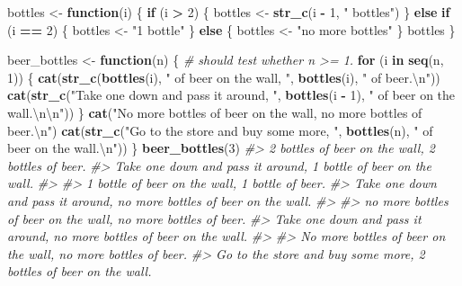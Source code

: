 \documentclass[]{book}
\newenvironment{Shaded}{\begin{snugshade}}{\end{snugshade}}
\newcommand{\CharTok}[1]{\textcolor[rgb]{0.31,0.60,0.02}{#1}}
\newcommand{\CommentTok}[1]{\textcolor[rgb]{0.56,0.35,0.01}{\textit{#1}}}
\newcommand{\ControlFlowTok}[1]{\textcolor[rgb]{0.13,0.29,0.53}{\textbf{#1}}}
\newcommand{\DecValTok}[1]{\textcolor[rgb]{0.00,0.00,0.81}{#1}}
\newcommand{\KeywordTok}[1]{\textcolor[rgb]{0.13,0.29,0.53}{\textbf{#1}}}
\newcommand{\NormalTok}[1]{#1}
\newcommand{\OperatorTok}[1]{\textcolor[rgb]{0.81,0.36,0.00}{\textbf{#1}}}
\newcommand{\StringTok}[1]{\textcolor[rgb]{0.31,0.60,0.02}{#1}}
\theoremstyle{definition}
\theoremstyle{definition}
\theoremstyle{definition}
\theoremstyle{remark}
\begin{document}
\begin{Shaded}
\begin{Highlighting}[]
\NormalTok{bottles <-}\StringTok{ }\ControlFlowTok{function}\NormalTok{(i) \{}
  \ControlFlowTok{if}\NormalTok{ (i }\OperatorTok{>}\StringTok{ }\DecValTok{2}\NormalTok{) \{}
\NormalTok{   bottles <-}\StringTok{ }\KeywordTok{str_c}\NormalTok{(i }\OperatorTok{-}\StringTok{ }\DecValTok{1}\NormalTok{, }\StringTok{" bottles"}\NormalTok{)}
\NormalTok{  \} }\ControlFlowTok{else} \ControlFlowTok{if}\NormalTok{ (i }\OperatorTok{==}\StringTok{ }\DecValTok{2}\NormalTok{) \{}
\NormalTok{   bottles <-}\StringTok{ "1 bottle"}
\NormalTok{  \} }\ControlFlowTok{else}\NormalTok{ \{}
\NormalTok{   bottles <-}\StringTok{ "no more bottles"}
\NormalTok{  \}}
\NormalTok{  bottles}
\NormalTok{\}}

\NormalTok{beer_bottles <-}\StringTok{ }\ControlFlowTok{function}\NormalTok{(n) \{}
  \CommentTok{# should test whether n >= 1.}
  \ControlFlowTok{for}\NormalTok{ (i }\ControlFlowTok{in} \KeywordTok{seq}\NormalTok{(n, }\DecValTok{1}\NormalTok{)) \{}
     \KeywordTok{cat}\NormalTok{(}\KeywordTok{str_c}\NormalTok{(}\KeywordTok{bottles}\NormalTok{(i), }\StringTok{" of beer on the wall, "}\NormalTok{, }\KeywordTok{bottles}\NormalTok{(i), }\StringTok{" of beer.}\CharTok{\textbackslash{}n}\StringTok{"}\NormalTok{))}
     \KeywordTok{cat}\NormalTok{(}\KeywordTok{str_c}\NormalTok{(}\StringTok{"Take one down and pass it around, "}\NormalTok{, }\KeywordTok{bottles}\NormalTok{(i }\OperatorTok{-}\StringTok{ }\DecValTok{1}\NormalTok{),}
                \StringTok{" of beer on the wall.}\CharTok{\textbackslash{}n\textbackslash{}n}\StringTok{"}\NormalTok{))}
\NormalTok{  \}}
  \KeywordTok{cat}\NormalTok{(}\StringTok{"No more bottles of beer on the wall, no more bottles of beer.}\CharTok{\textbackslash{}n}\StringTok{"}\NormalTok{)}
  \KeywordTok{cat}\NormalTok{(}\KeywordTok{str_c}\NormalTok{(}\StringTok{"Go to the store and buy some more, "}\NormalTok{, }\KeywordTok{bottles}\NormalTok{(n), }\StringTok{" of beer on the wall.}\CharTok{\textbackslash{}n}\StringTok{"}\NormalTok{))}
\NormalTok{\}}
\KeywordTok{beer_bottles}\NormalTok{(}\DecValTok{3}\NormalTok{)}
\CommentTok{#> 2 bottles of beer on the wall, 2 bottles of beer.}
\CommentTok{#> Take one down and pass it around, 1 bottle of beer on the wall.}
\CommentTok{#> }
\CommentTok{#> 1 bottle of beer on the wall, 1 bottle of beer.}
\CommentTok{#> Take one down and pass it around, no more bottles of beer on the wall.}
\CommentTok{#> }
\CommentTok{#> no more bottles of beer on the wall, no more bottles of beer.}
\CommentTok{#> Take one down and pass it around, no more bottles of beer on the wall.}
\CommentTok{#> }
\CommentTok{#> No more bottles of beer on the wall, no more bottles of beer.}
\CommentTok{#> Go to the store and buy some more, 2 bottles of beer on the wall.}
\end{Highlighting}
\end{Shaded}
\end{document}
